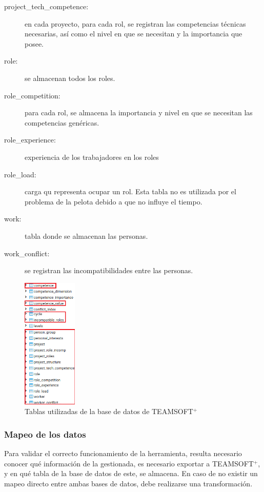 \begin{description}
	\item[project\_tech\_competence:] en cada proyecto, para cada rol, se registran las 
	competencias técnicas necesarias, así como el nivel en que se necesitan y la importancia que posee. 
	
	\item[role:] se almacenan todos los roles.
	
	\item[role\_competition:] para cada rol, se almacena la importancia y nivel en que se necesitan las competencias genéricas.
	
	\item[role\_experience:] experiencia de los trabajadores en los roles
	
	\item[role\_load:] carga qu representa ocupar un rol. Esta tabla no es utilizada por el problema de la pelota debido a que no influye el tiempo.
	
	\item[work:] tabla donde se almacenan las personas.
	
	\item[work\_conflict:] se registran las incompatibilidades entre las personas.
\end{description}

\begin{figure}[H]
	\centering
	\includegraphics[width=0.23\textwidth]{figuras/tablasTeamSoft.png}
	\caption{Tablas utilizadas de la base de datos de TEAMSOFT$^+$}\label{fig:tablas-teamsoft}
\end{figure}

\subsubsection{Mapeo de los datos}
Para validar el correcto funcionamiento de la herramienta, resulta necesario conocer qué información de la gestionada, es necesario exportar a TEAMSOFT$^+$, y en qué tabla de la base de datos de este, se almacena. En caso de no existir un mapeo directo entre ambas bases de datos,  debe realizarse una transformación.\\

